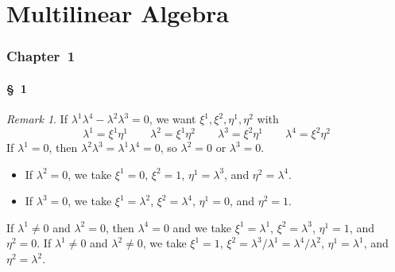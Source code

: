 \documentclass[letterpaper,12pt]{article}
\theoremstyle{definition}
\theoremstyle{remark}
\newtheorem*{rmk}{Remark}
\begin{document}
\newpage
\part*{Multilinear Algebra}

\section*{Chapter~1}
\subsection*{\S~1}
\begin{rmk}
If \(\lambda^1\lambda^4-\lambda^2\lambda^3=0\), we want \(\xi^1,\xi^2,\eta^1,\eta^2\) with
\[\lambda^1=\xi^1\eta^1\qquad\lambda^2=\xi^1\eta^2\qquad\lambda^3=\xi^2\eta^1\qquad\lambda^4=\xi^2\eta^2\]
If \(\lambda^1=0\), then \(\lambda^2\lambda^3=\lambda^1\lambda^4=0\), so \(\lambda^2=0\) or \(\lambda^3=0\).
\begin{itemize}[itemsep=0pt]
\item If \(\lambda^2=0\), we take \(\xi^1=0\), \(\xi^2=1\), \(\eta^1=\lambda^3\), and \(\eta^2=\lambda^4\).
\item If \(\lambda^3=0\), we take \(\xi^1=\lambda^2\), \(\xi^2=\lambda^4\), \(\eta^1=0\), and \(\eta^2=1\).
\end{itemize}
If \(\lambda^1\ne 0\) and \(\lambda^2=0\), then \(\lambda^4=0\) and we take \(\xi^1=\lambda^1\), \(\xi^2=\lambda^3\), \(\eta^1=1\), and \(\eta^2=0\). If \(\lambda^1\ne 0\) and \(\lambda^2\ne 0\), we take \(\xi^1=1\), \(\xi^2=\lambda^3/\lambda^1=\lambda^4/\lambda^2\), \(\eta^1=\lambda^1\), and \(\eta^2=\lambda^2\).
\end{rmk}
\end{document}
